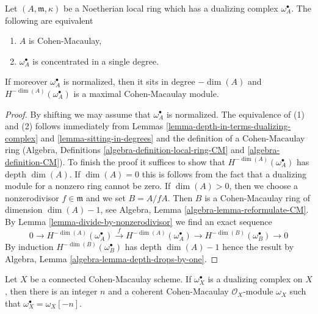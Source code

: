 \begin{lemma}
\label{lemma-apply-CM}
Let $(A, \mathfrak m, \kappa)$ be a Noetherian local ring
which has a dualizing complex $\omega_A^\bullet$.
The following are equivalent
\begin{enumerate}
\item $A$ is Cohen-Macaulay,
\item $\omega_A^\bullet$ is concentrated in a single degree.
\end{enumerate}
If moreover $\omega_A^\bullet$ is normalized, then it sits in degree
$-\dim(A)$ and $H^{-\dim(A)}(\omega_A^\bullet)$ is a maximal
Cohen-Macaulay module.
\end{lemma}

\begin{proof}
By shifting we may assume that $\omega_A^\bullet$ is normalized.
The equivalence of (1) and (2) follows immediately from
Lemmas \ref{lemma-depth-in-terms-dualizing-complex} and
\ref{lemma-sitting-in-degrees}
and the definition of a Cohen-Macaulay ring (Algebra, Definitions
\ref{algebra-definition-local-ring-CM} and
\ref{algebra-definition-CM}). To finish the proof it suffices to show
that $H^{-\dim(A)}(\omega_A^\bullet)$ has depth $\dim(A)$.
If $\dim(A) = 0$ this is follows from the fact that a dualizing module
for a nonzero ring cannot be zero. If $\dim(A) > 0$, then we choose
a nonzerodivisor $f \in \mathfrak m$ and we set $B = A/fA$.
Then $B$ is a Cohen-Macaulay ring of dimension $\dim(A) - 1$,
see Algebra, Lemma \ref{algebra-lemma-reformulate-CM}.
By Lemma \ref{lemma-divide-by-nonzerodivisor}
we find an exact sequence
$$
0 \to H^{-\dim(A)}(\omega_A^\bullet) \xrightarrow{f}
H^{-\dim(A)}(\omega_A^\bullet) \to
H^{-\dim(B)}(\omega_B^\bullet) \to 0
$$
By induction $H^{-\dim(B)}(\omega_B^\bullet)$ has depth
$\dim(A) - 1$
hence the result by Algebra, Lemma \ref{algebra-lemma-depth-drops-by-one}.
\end{proof}

\begin{lemma}
\label{lemma-dualizing-module-CM-scheme}
Let $X$ be a connected Cohen-Macaulay scheme. If $\omega_X^\bullet$
is a dualizing complex on $X$, then there is an integer $n$
and a coherent Cohen-Macaulay $\mathcal{O}_X$-module $\omega_X$
such that $\omega_X^\bullet = \omega_X[-n]$.
\end{lemma}

